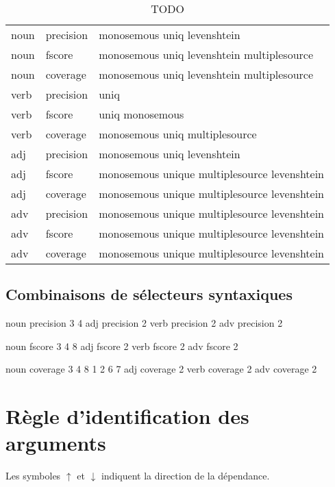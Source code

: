 \documentclass[oneside,parskip,draft]{scrbook}
\begin{document}
\begin{table}[ht]
    \centering
    \begin{tabular}{lll}
        \toprule
        noun &  precision &  monosemous uniq levenshtein \\
        noun &  fscore    &  monosemous uniq levenshtein multiplesource \\
        noun &  coverage  &  monosemous uniq levenshtein multiplesource \\
        \midrule
        verb &  precision &  uniq \\
        verb &  fscore    &  uniq monosemous \\
        verb &  coverage  &  monosemous uniq multiplesource \\
        \midrule
        adj  &  precision &  monosemous uniq levenshtein \\
        adj  &  fscore    &  monosemous unique multiplesource levenshtein \\
        adj  &  coverage  &  monosemous unique multiplesource levenshtein \\
        \midrule
        adv  &  precision &  monosemous unique multiplesource levenshtein \\
        adv  &  fscore    &  monosemous unique multiplesource levenshtein \\
        adv  &  coverage  &  monosemous unique multiplesource levenshtein \\
        \bottomrule
    \end{tabular}
    \caption{TODO}
\end{table}

\subsection{Combinaisons de sélecteurs syntaxiques}

noun precision 3 4
adj precision 2
verb precision 2
adv precision 2

noun fscore 3 4 8
adj fscore 2
verb fscore 2
adv fscore 2

noun coverage 3 4 8 1 2 6 7
adj coverage 2
verb coverage 2
adv coverage 2

\section{Règle d'identification des arguments}
\label{argument_identification}

Les symboles $\uparrow$ et $\downarrow$ indiquent la direction de la
dépendance.
\end{document}
